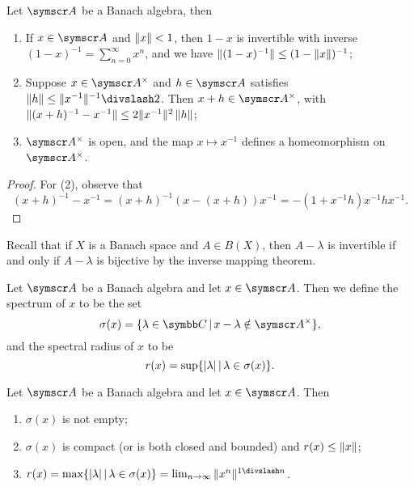 \begin{proposition}
  Let $\BA{A}$ be a Banach algebra, then
  \begin{enumerate}
    \item If $x\in \BA{A}$ and $\Vert x\Vert<1$, then $1-x$ is invertible with inverse $(1-x)^{-1}=\sum_{n=0}^\infty x^n$, and we have $\Vert(1-x)^{-1}\Vert\leq (1-\Vert x\Vert)^{-1}$;
    \item Suppose $x\in \BA{A}^\times$ and $h\in \BA{A}$ satisfies $\NORM{h}\leq\NORM{x^{-1}}^{-1}\DIV 2$. Then $x+h\in \BA{A}^{\times}$, with $\Vert(x+h)^{-1}-x^{-1}\Vert\leq 2\Vert x^{-1}\Vert^2\,\Vert h\Vert$;
    \item $\BA{A}^\times$ is open, and the map $x\mapsto x^{-1}$ defines a homeomorphism on $\BA{A}^\times$.
  \end{enumerate}
\end{proposition}

\begin{proof}
  For (2), observe that
  \begin{equation}
    (x+h)^{-1}-x^{-1}=(x+h)^{-1}(x-(x+h))x^{-1}=-(1+x^{-1}h)x^{-1}hx^{-1}.
  \end{equation}
\end{proof}

Recall that if $X$ is a Banach space and $A\in B(X)$, then $A-\lambda$ is invertible if and only if $A-\lambda$ is bijective by the inverse mapping theorem.

\begin{definition}
  Let $\BA A$ be a Banach algebra and let $x\in \BA A$. Then we define the spectrum of $x$ to be the set
  \begin{equation*}
    \sigma(x)=\{\lambda\in \CC\VERT x-\lambda\notin \BA{A}^{\times}\},
  \end{equation*}
  and the spectral radius of $x$ to be
  \begin{equation*}
    r(x)=\sup\{\vert\lambda\vert\,\vert\, \lambda\in \sigma(x)\}.
  \end{equation*}
\end{definition}

\begin{proposition}
  Let $\BA A$ be a Banach algebra and let $x\in \BA A$. Then
  \begin{enumerate}
    \item $\sigma(x)$ is not empty;
    \item $\sigma(x)$ is compact (or is both closed and bounded) and $r(x)\leq \Vert x\Vert$;
    \item $r(x)=\max\{\ABS{\lambda}\VERT \lambda\in \sigma(x)\}=\lim_{n\to\infty}\NORM{x^n}^{1\DIV n}$.
  \end{enumerate}
\end{proposition}


